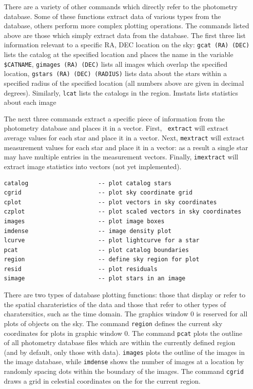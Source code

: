 \documentclass{article}
\begin{document}
There are a variety of other commands which directly refer to the
photometry database.  Some of these functions extract data of various
types from the database, others perform more complex plotting
operations.  The commands listed above are those which simply extract
data from the database.  The first three list information relevant to
a specific RA, DEC location on the sky: {\tt gcat (RA) (DEC)} lists
the catalog at the specified location and places the name in the
variable {\tt \$CATNAME}, {\tt gimages (RA) (DEC)} lists all images
which overlap the specified location, {\tt gstars (RA) (DEC) (RADIUS)}
lists data about the stars within a specified radius of the specified
location (all numbers above are given in decimal degrees).  Similarly,
{\tt lcat} lists the catalogs in the region.  Imstats lists statistics
about each image

The next three commands extract a specific piece of information from
the photometry database and places it in a vector.  First, {\tt
  extract} will extract average values for each star and place it in a
vector.  Next, {\tt mextract} will extract measurement values for each
star and place it in a vector: as a result a single star may have
multiple entries in the measurement vectors.  Finally, {\tt imextract}
will extract image statistics into vectors (not yet implemented).


\begin{verbatim}
catalog                    -- plot catalog stars
cgrid                      -- plot sky coordinate grid
cplot                      -- plot vectors in sky coordinates
czplot                     -- plot scaled vectors in sky coordinates
images                     -- plot image boxes
imdense                    -- image density plot
lcurve                     -- plot lightcurve for a star
pcat                       -- plot catalog boundaries
region                     -- define sky region for plot
resid                      -- plot residuals
simage                     -- plot stars in an image
\end{verbatim}

There are two types of database plotting functions: those that display
or refer to the spatial charateristics of the data and those that
refer to other types of charatersitics, such as the time domain.  The
graphics window 0 is reserved for all plots of objects on the sky.
The command {\tt region} defines the current sky coordinates for plots
in graphic window 0.  The command {\tt pcat} plots the outline of all
photometry database files which are within the currently defined
region (and by default, only those with data).  {\tt images} plots the
outline of the images in the image database, while {\tt imdense} shows
the number of images at a location by randomly spacing dots within the
boundary of the images.  The command {\tt cgrid}
draws a grid in celestial coordinates on the for the current region.
\end{document}
